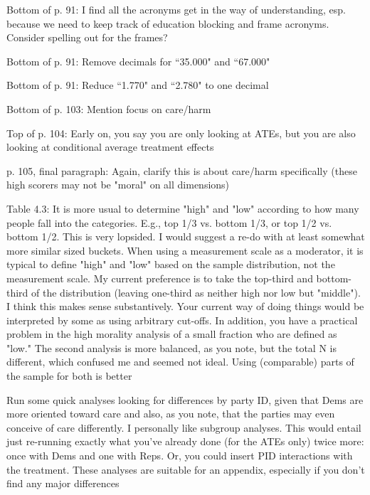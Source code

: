 \documentclass[12pt]{article}
\begin{document}
\begin{coi}
		\item Bottom of p. 91: I find all the acronyms get in the way of understanding, esp. because we need to keep track of education blocking and frame acronyms. Consider spelling out for the frames?
		\item Bottom of p. 91: Remove decimals for ``35.000" and ``67.000"
		\item Bottom of p. 91: Reduce ``1.770" and ``2.780" to one decimal
		\item Bottom of p. 103: Mention focus on care/harm
		\item Top of p. 104: Early on, you say you are only looking at ATEs, but you are also looking at conditional average treatment effects
		\item p. 105, final paragraph: Again, clarify this is about care/harm specifically (these high scorers may not be "moral" on all dimensions)
		\item Table 4.3: It is more usual to determine "high" and "low" according to how many people fall into the categories. E.g., top 1/3 vs. bottom 1/3, or top 1/2 vs. bottom 1/2. This is very lopsided. I would suggest a re-do with at least somewhat more similar sized buckets. When using a measurement scale as a moderator, it is typical to define "high" and "low" based on the sample distribution, not the measurement scale. My current preference is to take the top-third and bottom-third of the distribution (leaving one-third as neither high nor low but "middle"). I think this makes sense substantively. Your current way of doing things would be interpreted by some as using arbitrary cut-offs. In addition, you have a practical problem in the high morality analysis of a small fraction who are defined as "low." The second analysis is more balanced, as you note, but the total N is different, which confused me and seemed not ideal. Using (comparable) parts of the sample for both is better
		\item Run some quick analyses looking for differences by party ID, given that Dems are more oriented toward care and also, as you note, that the parties may even conceive of care differently. I personally like subgroup analyses. This would entail just re-running exactly what you've already done (for the ATEs only) twice more: once with Dems and one with Reps. Or, you could insert PID interactions with the treatment. These analyses are suitable for an appendix, especially if you don't find any major differences
	\end{coi}
\end{document}
